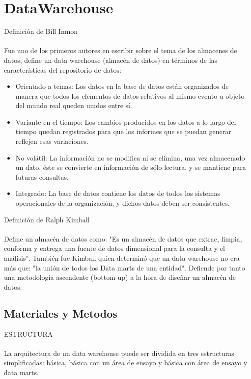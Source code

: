 \documentclass[preprint,12pt]{elsarticle}
\begin{document}
\section{DataWarehouse}

Definición de Bill Inmon\\
\\Fue uno de los primeros autores en escribir sobre el tema de los almacenes de datos, define un data warehouse (almacén de datos) en términos de las características del repositorio de datos:

\begin{itemize}
	\item Orientado a temas: Los datos en la base de datos están organizados de manera que todos los elementos de datos relativos al mismo evento u objeto del mundo real queden unidos entre sí.
	\item Variante en el tiempo: Los cambios producidos en los datos a lo largo del tiempo quedan registrados para que los informes que se puedan generar reflejen esas variaciones.
	\item No volátil: La información no se modifica ni se elimina, una vez almacenado un dato, éste se convierte en información de sólo lectura, y se mantiene para futuras consultas.
	\item Integrado: La base de datos contiene los datos de todos los sistemas operacionales de la organización, y dichos datos deben ser consistentes.
\end{itemize}

Definición de Ralph Kimball\\
\\Define un almacén de datos como: "Es un almacén de datos que extrae, limpia, conforma y entrega una fuente de datos dimensional para la consulta y el análisis". También fue Kimball quien determinó que un data warehouse no era más que: "la unión de todos los Data marts de una entidad". Defiende por tanto una metodología ascendente (bottom-up) a la hora de diseñar un almacén de datos.


\subsection{Materiales y Metodos}

ESTRUCTURA\\
\\La arquitectura de un data warehouse puede ser dividida en tres estructuras simplificadas: básica, básica con un área de ensayo y básica con área de ensayo y data marts.
\end{document}
